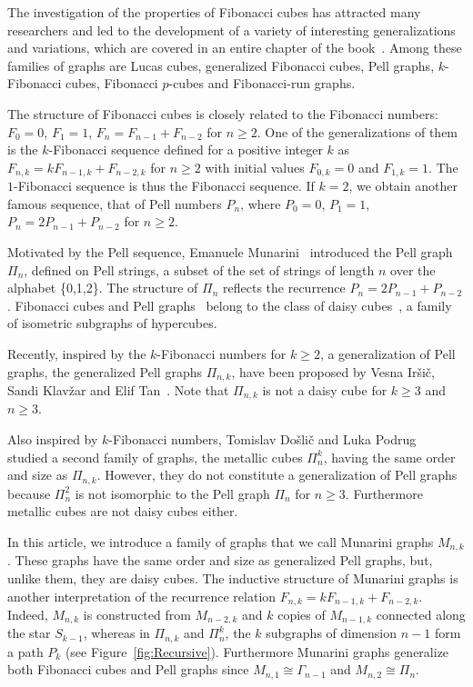 \documentclass[11pt]{article}
\begin{document}
The investigation of the properties of Fibonacci cubes has attracted many researchers and led to the development of a variety of interesting generalizations and variations, which are covered in an entire chapter of the book~\cite{EKM-2023}. Among these families of graphs are Lucas cubes, 
generalized Fibonacci cubes, Pell graphs, 
$k$-Fibonacci cubes, Fibonacci $p$-cubes and Fibonacci-run graphs.

The structure of Fibonacci cubes is  closely related to the Fibonacci numbers: $F_0 = 0$, $F_1=1$, $F_{n} = F_{n-1} + F_{n-2}$ for $n\geq 2$.
One of the generalizations of them is the $k$-Fibonacci sequence  defined for a positive integer $k$ as $F_{n,k} = k F_{n-1,k} + F_{n-2,k}$ for $n\geq 2$ with initial values $F_{0,k} = 0$ and $F_{1,k}=1$.
The  $1$-Fibonacci sequence is thus the Fibonacci sequence.
If $k=2$, we obtain another famous sequence, that of Pell numbers $P_{n}$, where $P_0 = 0$, $P_1=1$, $P_{n} = 2 P_{n-1} + P_{n-2}$ for $n\geq 2$.

Motivated by the Pell sequence, Emanuele Munarini~\cite{M-2019} introduced the Pell graph $\Pi_n$, defined on Pell strings, a subset of the set of strings of length $n$ over the alphabet \{0,1,2\}. The  structure of $\Pi_n$ reflects the recurrence $P_{n} = 2 P_{n-1} + P_{n-2}$.
Fibonacci cubes and Pell graphs~\cite[Theorem~9.68]{EKM-2023} belong to the class of daisy cubes~\cite{KM-2019a}, a family of isometric subgraphs of hypercubes.

Recently, inspired by the $k$-Fibonacci numbers for $k\geq2$, a generalization of Pell graphs, the generalized Pell graphs $\Pi _{n,k}$,  have been proposed by Vesna Ir\v{s}i\v{c}, Sandi Klav\v{z}ar and Elif Tan~\cite{IKT-2023}. Note that $\Pi _{n,k}$ is not a daisy cube for $k\geq3$ and $n\geq3$. 

Also inspired by $k$-Fibonacci numbers, Tomislav Do\v{s}li\v{c} and Luka Podrug~\cite{DP-2024} studied a second family of graphs, the metallic cubes $\Pi_{n}^{k}$, having the same order and size as $\Pi _{n,k}$. However, they do not constitute a  generalization of Pell graphs because $\Pi_{n}^{2}$ is not isomorphic to the Pell graph $\Pi_n$ for $n\geq 3$. Furthermore metallic cubes are not daisy cubes either.

In this article, we introduce a family of graphs that we call Munarini graphs $M_{n,k}$. These graphs have the same order and size as generalized Pell graphs, but, unlike them, they are daisy cubes. The inductive structure of Munarini graphs is another interpretation of the recurrence relation $F_{n,k} = k F_{n-1,k} + F_{n-2,k}$. Indeed, $M_{n,k}$ is constructed from $M_{n-2,k}$ and $k$ copies of $M_{n-1,k}$ connected along the star $S_{k-1}$, whereas in $\Pi_{n,k}$ and $\Pi_{n}^{k}$, the $k$ subgraphs of dimension $n-1$ form a path $P_{k}$ (see Figure~\ref{fig:Recursive}). Furthermore Munarini graphs generalize both Fibonacci cubes and Pell graphs since $M_{n,1}\cong\Gamma_{n-1}$ and $M_{n,2}\cong\Pi_{n}$. 
\end{document}
